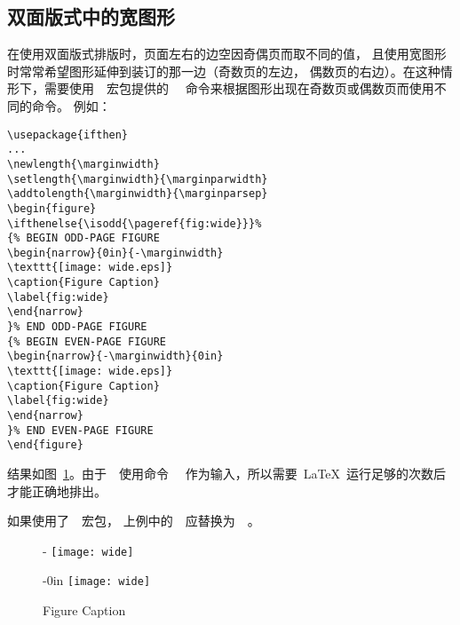 \subsection{双面版式中的宽图形}

在使用双面版式排版时，页面左右的边空因奇偶页而取不同的值，
且使用宽图形时常常希望图形延伸到装订的那一边（奇数页的左边，
偶数页的右边）。在这种情形下，需要使用~~宏包提供的
~~命令来根据图形出现在奇数页或偶数页而使用不同的命令。
例如：
\begin{Verbatim}[xleftmargin=1cm]
\usepackage{ifthen}
...
\newlength{\marginwidth}
\setlength{\marginwidth}{\marginparwidth}
\addtolength{\marginwidth}{\marginparsep}
\begin{figure} 
\ifthenelse{\isodd{\pageref{fig:wide}}}% 
{% BEGIN ODD-PAGE FIGURE 
\begin{narrow}{0in}{-\marginwidth} 
\texttt{[image: wide.eps]}
\caption{Figure Caption} 
\label{fig:wide} 
\end{narrow} 
}% END ODD-PAGE FIGURE 
{% BEGIN EVEN-PAGE FIGURE 
\begin{narrow}{-\marginwidth}{0in} 
\texttt{[image: wide.eps]} 
\caption{Figure Caption} 
\label{fig:wide} 
\end{narrow} 
}% END EVEN-PAGE FIGURE 
\end{figure}
\end{Verbatim}
结果如图~\ref{fig:wide}。由于~~使用命令~~
作为输入，所以需要~\LaTeX{}~运行足够的次数后才能正确地排出。

如果使用了~~宏包，
上例中的~~应替换为~~。

\newlength{\marginwidth}
\setlength{\marginwidth}{\marginparwidth}
\addtolength{\marginwidth}{\marginparsep}

\begin{figure}[hbp] 
	{%
		\begin{narrow}{0in}{-\marginwidth} 
			\texttt{[image: wide]}
			\caption{Figure Caption}  
			\label{fig:wide}  
		\end{narrow}  
	}%
	{%
		\begin{narrow}{-\marginwidth}{0in} 
			\texttt{[image: wide]} 
			\caption{Figure Caption} 
			\label{fig:wide} 
		\end{narrow} 
	}%
\end{figure}

